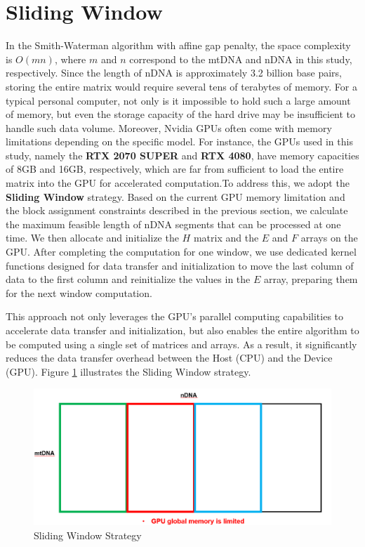 \documentclass[PhD]{PHlab-thesis}
\begin{document}
\section{Sliding Window}
In the Smith-Waterman algorithm with affine gap penalty, the space complexity is $O(mn)$, where $m$ and $n$ correspond to the mtDNA and nDNA in this study, respectively. Since the length of nDNA is approximately 3.2 billion base pairs, storing the entire matrix would require several tens of terabytes of memory. For a typical personal computer, not only is it impossible to hold such a large amount of memory, but even the storage capacity of the hard drive may be insufficient to handle such data volume. Moreover, Nvidia GPUs often come with memory limitations depending on the specific model. For instance, the GPUs used in this study, namely the \textbf{RTX 2070 SUPER} and \textbf{RTX 4080}, have memory capacities of 8GB and 16GB, respectively, which are far from sufficient to load the entire matrix into the GPU for accelerated computation.To address this, we adopt the \textbf{Sliding Window} strategy. Based on the current GPU memory limitation and the block assignment constraints described in the previous section, we calculate the maximum feasible length of nDNA segments that can be processed at one time. We then allocate and initialize the $H$ matrix and the $E$ and $F$ arrays on the GPU. After completing the computation for one window, we use dedicated kernel functions designed for data transfer and initialization to move the last column of data to the first column and reinitialize the values in the $E$ array, preparing them for the next window computation.

This approach not only leverages the GPU’s parallel computing capabilities to accelerate data transfer and initialization, but also enables the entire algorithm to be computed using a single set of matrices and arrays. As a result, it significantly reduces the data transfer overhead between the Host (CPU) and the Device (GPU). Figure \ref{fig:Sliding Window} illustrates the Sliding Window strategy.
\begin{figure}[htbp]
    \centering
    \includegraphics[width=1\linewidth]{figures/Sliding Window.png}
    \caption{Sliding Window Strategy}
    \label{fig:Sliding Window}
\end{figure}
\end{document}
